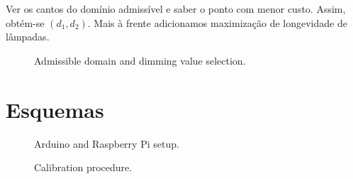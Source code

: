 \documentclass[english,palatino]{ist-report}
\begin{document}
Ver os cantos do domínio admissível e saber o ponto com menor custo. Assim, obtém-se $(d_1,d_2)$. Mais à frente adicionamos maximização de longevidade de lâmpadas.
\begin{figure}[ht]
	\centering
	
	\caption{Admissible domain and dimming value selection.}
\end{figure}

\appendix
\section{Esquemas}

\begin{figure}[ht]
	\centering
	
	\caption{Arduino and Raspberry Pi setup.}
\end{figure}

\begin{figure}[ht]
	\centering
	
	\caption{Calibration procedure.}
	\label{fig:calib}
\end{figure}

\pagebreak
\printbibliography

\listoftodos
\end{document}
